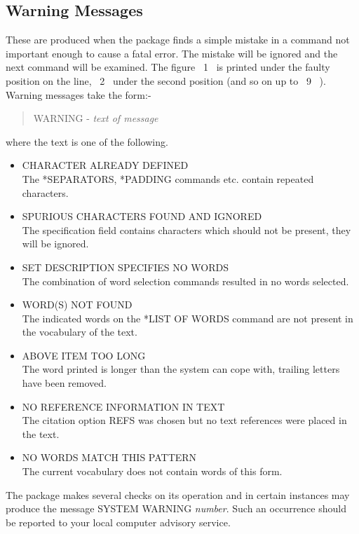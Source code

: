 \subsection{Warning Messages}
 These are produced when the package finds a simple mistake in a command
 not important enough to cause a fatal error.  The mistake will be
 ignored and the next command will be examined.
 The figure ~1~ is printed under the faulty position on the line, ~2~ under
the second position (and so on up to ~9~ ).
 Warning messages take the form:-
\begin{quote}
WARNING - {\em text of message}
\end{quote}
where the text is one of the following.
\begin{itemize}
\item  CHARACTER ALREADY DEFINED\\
          The *SEPARATORS, *PADDING commands etc. contain repeated
          characters.
\item  SPURIOUS CHARACTERS FOUND AND IGNORED\\
          The specification field contains characters which should
          not be present, they will be ignored.
\item  SET DESCRIPTION SPECIFIES NO WORDS\\
          The combination of word selection commands resulted in no
          words selected.
\item  WORD(S) NOT FOUND\\
          The indicated words on the *LIST OF WORDS command
          are not present in the vocabulary of the text.
\item  ABOVE ITEM TOO LONG\\
          The word printed is longer than the system can cope
          with, trailing letters have been removed.
\item  NO REFERENCE INFORMATION IN TEXT\\
          The citation option REFS was chosen but no text references
          were placed in the text.
\item  NO WORDS MATCH THIS PATTERN\\
          The current vocabulary does not contain words of this form.
\end{itemize}

 The package makes several checks on its operation and in certain instances
 may produce the message SYSTEM WARNING {\em number}. Such an occurrence should
 be reported to your local computer advisory service.

